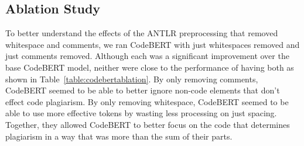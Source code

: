 \documentclass[twocolumn]{article}
\begin{document}
 \begin{table}[ht]
\centering
\captionsetup{font=small}
\caption{\textsc{Comparison Of Results}}
\fontsize{20}{24}\selectfont 
\label{table:resultscomparison}
\end{table}
 
 
\subsection{\normalsize Ablation Study}

To better understand the effects of the ANTLR preprocessing that removed whitespace and comments, we ran CodeBERT with just whitespaces removed and just comments removed. Although each was a significant improvement over the base CodeBERT model, neither were close to the performance of having both as shown in Table~\ref{table:codebertablation}. By only removing comments, CodeBERT seemed to be able to better ignore non-code elements that don't effect code plagiarism. By only removing whitespace, CodeBERT seemed to be able to use more effective tokens by wasting less processing on just spacing.  Together, they allowed CodeBERT to better focus on the code that determines plagiarism in a way that was more than the sum of their parts.
\end{document}
